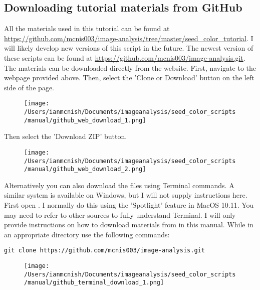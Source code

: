 \documentclass[12pt]{article}
\begin{document}
\subsection{Downloading tutorial materials from GitHub}\label{sec:github}

\noindent All the materials used in this tutorial can be found at \url{https://github.com/mcnis003/image-analysis/tree/master/seed_color_tutorial}. I will likely develop new versions of this script in the future. The newest version of these scripts can be found at \url{https://github.com/mcnis003/image-analysis.git}.\\

\noindent The materials can be downloaded directly from the  website. First, navigate to the webpage provided above. Then, select the 'Clone or Download' button on the left side of the page.\\

\begin{figure}[H]
	\centering
	\texttt{[image: /Users/ianmcnish/Documents/imageanalysis/seed\_color\_scripts/manual/github\_web\_download\_1.png]}
	\label{fig:github_web_download_1}
\end{figure}

\noindent Then select the 'Download ZIP' button.

\begin{figure}[H]
	\centering
	\texttt{[image: /Users/ianmcnish/Documents/imageanalysis/seed\_color\_scripts/manual/github\_web\_download\_2.png]}
	\label{fig:github_web_download_2}
\end{figure}

\noindent Alternatively you can also download the files using Terminal commands. A similar system is available on Windows, but I will not supply instructions here. First open . I normally do this using the 'Spotlight' feature in MacOS 10.11. You may need to refer to other sources to fully understand Terminal. I will only provide instructions on how to download materials from  in this manual. While in an appropriate directory use the following commands:\\

\begin{lstlisting}
git clone https://github.com/mcnis003/image-analysis.git
\end{lstlisting}

\begin{figure}[H]
	\centering
	\texttt{[image: /Users/ianmcnish/Documents/imageanalysis/seed\_color\_scripts/manual/github\_terminal\_download\_1.png]}
	\label{fig:github_terminal_download_1}
\end{figure}
\end{document}
